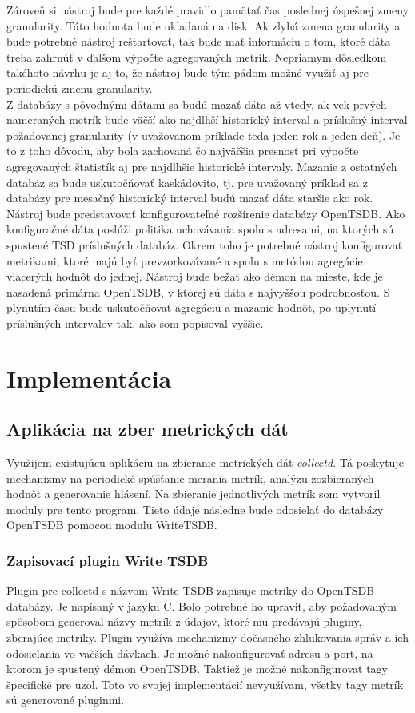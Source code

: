 \documentclass[printed,11pt,twoside,color,cover,table]{fithesis3}
\begin{document}
Zároveň si nástroj bude pre každé pravidlo pamätať čas poslednej úspešnej zmeny granularity. Táto hodnota bude ukladaná na disk. Ak zlyhá zmena granularity a bude potrebné nástroj reštartovať, 
tak bude mať informáciu o tom, ktoré dáta treba zahrnúť v ďalšom výpočte agregovaných metrík. Nepriamym dôsledkom takéhoto návrhu je aj to, že nástroj bude tým pádom možné využiť aj pre periodickú
zmenu granularity.
\\Z databázy s pôvodnými dátami sa budú mazať dáta až vtedy, ak vek prvých nameraných metrík bude väčší ako najdlhší historický interval a príslušný interval požadovanej granularity (v uvažovanom príklade 
teda jeden rok a jeden deň). Je to z toho dôvodu, aby bola zachovaná čo najväčšia presnosť pri výpočte agregovaných štatistík aj pre najdlhšie historické intervaly. Mazanie z ostatných databáz sa bude 
uskutočňovať kaskádovito, tj. pre uvažovaný príklad sa z databázy pre mesačný historický interval budú mazať dáta staršie ako rok.
\\Nástroj bude predstavovať konfigurovateľné rozšírenie databázy OpenTSDB. Ako konfiguračné dáta poslúži politika uchovávania spolu s adresami, na ktorých sú spustené TSD príslušných databáz. Okrem toho je potrebné nástroj konfigurovať
metrikami, ktoré majú byť prevzorkovávané a spolu s metódou agregácie viacerých hodnôt do jednej. Nástroj bude bežať ako démon na mieste,
kde je nasadená primárna OpenTSDB, v ktorej sú dáta s najvyššou podrobnosťou. S plynutím času bude uskutočňovať agregáciu a mazanie hodnôt,
po uplynutí príslušných intervalov tak, ako som popisoval vyššie.

\chapter{Implementácia}
\section{Aplikácia na zber metrických dát}
Využijem existujúcu aplikáciu na zbieranie metrických dát \emph{collectd}. Tá poskytuje mechanizmy na periodické spúšťanie merania metrík,
analýzu zozbieraných hodnôt a generovanie hlásení. Na zbieranie jednotlivých metrík som vytvoril moduly pre tento program. Tieto údaje následne bude odosielať do databázy OpenTSDB
pomocou modulu WriteTSDB.

\subsection{Zapisovací plugin Write TSDB}
Plugin pre collectd s názvom Write TSDB zapisuje metriky do OpenTSDB databázy.\cite{writetsdb} 
Je napísaný v jazyku C. Bolo potrebné ho upraviť, aby požadovaným spôsobom generoval názvy metrík z údajov, ktoré mu predávajú pluginy, zberajúce metriky. Plugin využíva mechanizmy
dočasného zhlukovania správ a ich odosielania vo väčších dávkach. Je možné nakonfigurovať adresu a port, na ktorom je spustený
démon OpenTSDB. Taktiež je možné nakonfigurovať tagy špecifické pre uzol. Toto vo svojej implementácií nevyužívam, všetky tagy metrík sú generované pluginmi.
\end{document}
